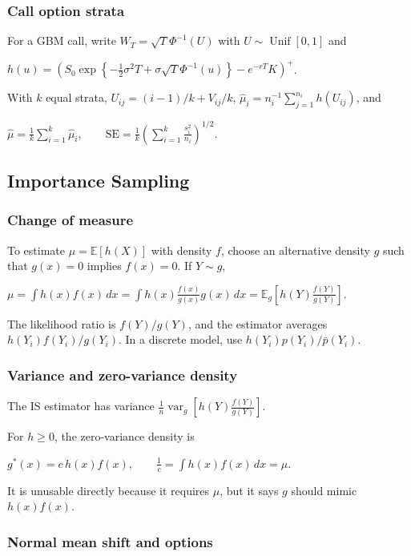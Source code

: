 \subsubsection*{Call option strata}

For a GBM call, write $W_T=\sqrt{T}\Phi^{-1}(U)$ with $U\sim\operatorname{Unif}[0,1]$ and

$h(u)=\left(S_0\exp\left\{-\frac12\sigma^2T+\sigma\sqrt{T}\Phi^{-1}(u)\right\}-e^{-rT}K\right)^+$.

With $k$ equal strata, $U_{ij}=(i-1)/k+V_{ij}/k$, $\hat{\mu}_i=n_i^{-1}\sum_{j=1}^{n_i}h(U_{ij})$, and

$\hat{\mu}=\frac{1}{k}\sum_{i=1}^k\hat{\mu}_i,\qquad \mathrm{SE}=\frac{1}{k}\left(\sum_{i=1}^k\frac{s_i^2}{n_i}\right)^{1/2}$.

\subsection{Importance Sampling}

\subsubsection*{Change of measure}

To estimate $\mu=\mathbb{E}[h(X)]$ with density $f$, choose an alternative density $g$ such that $g(x)=0$ implies $f(x)=0$. If $Y\sim g$,

$\mu=\int h(x)f(x)\,dx=\int h(x)\frac{f(x)}{g(x)}g(x)\,dx=\mathbb{E}_g\left[h(Y)\frac{f(Y)}{g(Y)}\right]$.

The likelihood ratio is $f(Y)/g(Y)$, and the estimator averages $h(Y_i)f(Y_i)/g(Y_i)$. In a discrete model, use $h(Y_i)p(Y_i)/\bar{p}(Y_i)$.

\subsubsection*{Variance and zero-variance density}

The IS estimator has variance
$\frac{1}{n}\operatorname{var}_g\left[h(Y)\frac{f(Y)}{g(Y)}\right]$.

For $h\ge0$, the zero-variance density is

$g^*(x)=c\,h(x)f(x),\qquad \frac{1}{c}=\int h(x)f(x)\,dx=\mu$.

It is unusable directly because it requires $\mu$, but it says $g$ should mimic $h(x)f(x)$.

\subsubsection*{Normal mean shift and options}

